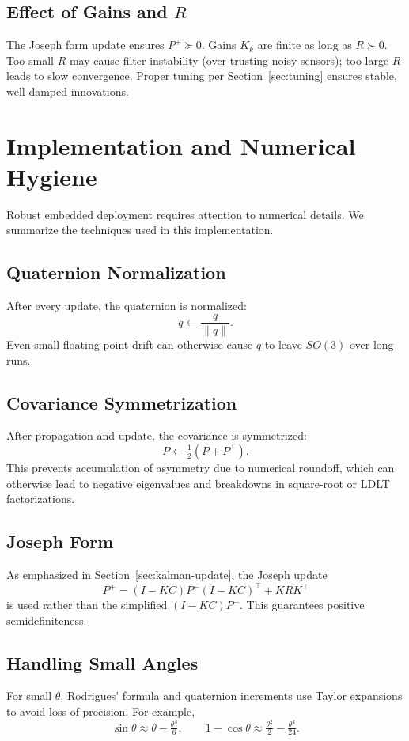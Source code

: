 \documentclass[10pt]{extarticle}
\begin{document}
\subsection{Effect of Gains and $R$}
The Joseph form update ensures $P^+\succeq 0$. Gains $K_k$ are finite as long as
$R\succ 0$. Too small $R$ may cause filter instability (over-trusting noisy sensors);
too large $R$ leads to slow convergence. Proper tuning per Section~\ref{sec:tuning} ensures
stable, well-damped innovations.


\section{Implementation and Numerical Hygiene}
\label{sec:implementation}

Robust embedded deployment requires attention to numerical details. We summarize the
techniques used in this implementation.

\subsection{Quaternion Normalization}
After every update, the quaternion is normalized:
\[
q \leftarrow \frac{q}{\|q\|}.
\]
Even small floating-point drift can otherwise cause $q$ to leave $SO(3)$ over long runs.

\subsection{Covariance Symmetrization}
After propagation and update, the covariance is symmetrized:
\[
P \leftarrow \tfrac{1}{2}(P+P^\top).
\]
This prevents accumulation of asymmetry due to numerical roundoff, which can otherwise
lead to negative eigenvalues and breakdowns in square-root or LDLT factorizations.

\subsection{Joseph Form}
As emphasized in Section~\ref{sec:kalman-update}, the Joseph update
\[
P^+ = (I-KC)P^-(I-KC)^\top + KRK^\top
\]
is used rather than the simplified $(I-KC)P^-$. This guarantees positive semidefiniteness.

\subsection{Handling Small Angles}
For small $\theta$, Rodrigues’ formula and quaternion increments use Taylor expansions to
avoid loss of precision. For example,
\[
\sin\theta \approx \theta - \tfrac{\theta^3}{6},\qquad
1-\cos\theta \approx \tfrac{\theta^2}{2} - \tfrac{\theta^4}{24}.
\]
\end{document}
